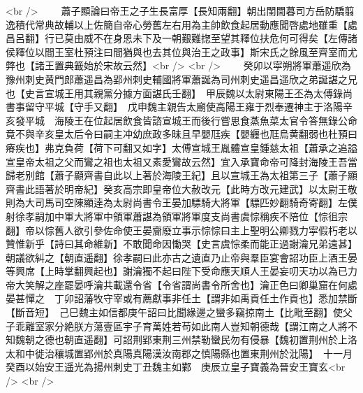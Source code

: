 <br />
　　蕭子顯論曰帝王之子生長富厚【長知兩翻】朝出閨閫暮司方岳防驕翦逸積代常典故輔以上佐簡自帝心勞舊左右用為主帥飲食起居動應聞啓處地雖重【處昌呂翻】行已莫由威不在身恩未下及一朝艱難揔至望其釋位扶危何可得矣【左傳諸侯釋位以間王室杜預注曰間猶與也去其位與治王之政事】斯宋氏之餘風至齊室而尤弊也【諸王置典籖始於宋故云然】<br />
<br />
　　癸卯以寜朔將軍蕭遥欣為豫州刺史黄門郎蕭遥昌為郢州刺史輔國將軍蕭誕為司州刺史遥昌遥欣之弟誕諶之兄也【史言宣城王用其親黨分據方面諶氏壬翻】　甲辰魏以太尉東陽王丕為太傅錄尚書事留守平城【守手又翻】　戊申魏主親告太廟使高陽王雍于烈奉遷神主于洛陽辛亥發平城　海陵王在位起居飲食皆諮宣城王而後行嘗思食蒸魚菜太官令答無錄公命竟不與辛亥皇太后令曰嗣主冲幼庶政多昧且早嬰尫疾【嬰纒也尫烏黄翻弱也杜預曰瘠疾也】弗克負荷【荷下可翻又如字】太傅宣城王胤體宣皇鍾慈太祖【蕭承之追謚宣皇帝太祖之父而鸞之祖也太祖又素愛鸞故云然】宜入承寶命帝可降封海陵王吾當歸老别館【蕭子顯齊書自此以上著於海陵王紀】且以宣城王為太祖第三子【蕭子顯齊書此語著於明帝紀】癸亥高宗即皇帝位大赦改元【此時方改元建武】以太尉王敬則為大司馬司空陳顯逹為太尉尚書令王晏加驃騎大將軍【驃匹妙翻騎奇寄翻】左僕射徐孝嗣加中軍大將軍中領軍蕭諶為領軍將軍度支尚書虞悰稱疾不陪位【悰徂宗翻】帝以悰舊人欲引參佐命使王晏齎廢立事示悰悰曰主上聖明公卿戮力寜假朽老以贊惟新乎【詩曰其命維新】不敢聞命因慟哭【史言虞悰柔而能正過謝瀹兄弟遠甚】朝議欲糾之【朝直遥翻】徐孝嗣曰此亦古之遺直乃止帝與羣臣宴會詔功臣上酒王晏等興席【上時掌翻興起也】謝瀹獨不起曰陛下受命應天順人王晏妄叨天功以為已力帝大笑解之座罷晏呼瀹共載還令省【令省謂尚書令所舍也】瀹正色曰卿巢窟在何處晏甚憚之　丁卯詔藩牧守宰或有薦獻事非任土【謂非如禹貢任土作貢也】悉加禁斷【斷音短】　己巳魏主如信都庚午詔曰比聞緣邊之蠻多竊掠南土【比毗至翻】使父子乖離室家分絶朕方蕩壹區宇子育萬姓若苟如此南人豈知朝德哉【謂江南之人將不知魏朝之德也朝直遥翻】可詔荆郢東荆三州禁勒蠻民勿有侵暴【魏初置荆州於上洛太和中徙治穰城置郢州於真陽真陽漢汝南郡之慎陽縣也置東荆州於沘陽】　十一月癸酉以始安王遥光為揚州刺史丁丑魏主如鄴　庚辰立皇子寶義為晉安王寶玄<br />
<br />
